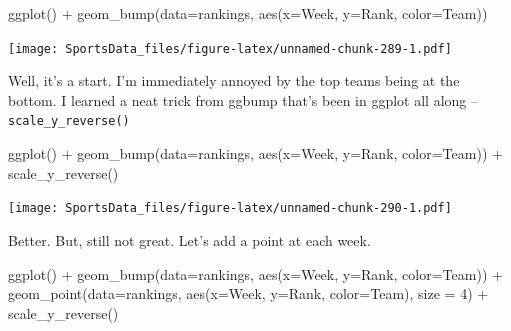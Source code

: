 \documentclass[
]{book}
\newenvironment{Shaded}{\begin{snugshade}}{\end{snugshade}}
\newcommand{\AttributeTok}[1]{\textcolor[rgb]{0.77,0.63,0.00}{#1}}
\newcommand{\DecValTok}[1]{\textcolor[rgb]{0.00,0.00,0.81}{#1}}
\newcommand{\FunctionTok}[1]{\textcolor[rgb]{0.00,0.00,0.00}{#1}}
\newcommand{\NormalTok}[1]{#1}
\newcommand{\SpecialCharTok}[1]{\textcolor[rgb]{0.00,0.00,0.00}{#1}}
\begin{document}
\begin{Shaded}
\begin{Highlighting}[]
\FunctionTok{ggplot}\NormalTok{() }\SpecialCharTok{+} \FunctionTok{geom\_bump}\NormalTok{(}\AttributeTok{data=}\NormalTok{rankings, }\FunctionTok{aes}\NormalTok{(}\AttributeTok{x=}\NormalTok{Week, }\AttributeTok{y=}\NormalTok{Rank, }\AttributeTok{color=}\NormalTok{Team))}
\end{Highlighting}
\end{Shaded}

\texttt{[image: SportsData\_files/figure-latex/unnamed-chunk-289-1.pdf]}

Well, it's a start. I'm immediately annoyed by the top teams being at the bottom. I learned a neat trick from ggbump that's been in ggplot all along -- \texttt{scale\_y\_reverse()}

\begin{Shaded}
\begin{Highlighting}[]
\FunctionTok{ggplot}\NormalTok{() }\SpecialCharTok{+} \FunctionTok{geom\_bump}\NormalTok{(}\AttributeTok{data=}\NormalTok{rankings, }\FunctionTok{aes}\NormalTok{(}\AttributeTok{x=}\NormalTok{Week, }\AttributeTok{y=}\NormalTok{Rank, }\AttributeTok{color=}\NormalTok{Team)) }\SpecialCharTok{+} \FunctionTok{scale\_y\_reverse}\NormalTok{()}
\end{Highlighting}
\end{Shaded}

\texttt{[image: SportsData\_files/figure-latex/unnamed-chunk-290-1.pdf]}

Better. But, still not great. Let's add a point at each week.

\begin{Shaded}
\begin{Highlighting}[]
\FunctionTok{ggplot}\NormalTok{() }\SpecialCharTok{+} 
  \FunctionTok{geom\_bump}\NormalTok{(}\AttributeTok{data=}\NormalTok{rankings, }\FunctionTok{aes}\NormalTok{(}\AttributeTok{x=}\NormalTok{Week, }\AttributeTok{y=}\NormalTok{Rank, }\AttributeTok{color=}\NormalTok{Team)) }\SpecialCharTok{+} 
  \FunctionTok{geom\_point}\NormalTok{(}\AttributeTok{data=}\NormalTok{rankings, }\FunctionTok{aes}\NormalTok{(}\AttributeTok{x=}\NormalTok{Week, }\AttributeTok{y=}\NormalTok{Rank, }\AttributeTok{color=}\NormalTok{Team), }\AttributeTok{size =} \DecValTok{4}\NormalTok{) }\SpecialCharTok{+}
  \FunctionTok{scale\_y\_reverse}\NormalTok{() }
\end{Highlighting}
\end{Shaded}
\end{document}
